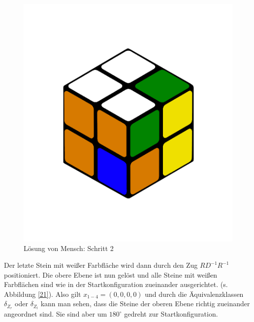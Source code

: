 \documentclass[12pt,a4paper, usenames, dvipsnames]{article}
\theoremstyle{mystyle}
\theoremstyle{definition}
\begin{document}
\begin{figure}[H]
\centering
\includegraphics[scale=0.12]{menschSchritt2.png}
\caption[Lösung von Mensch: Schritt 2]{Lösung von Mensch: Schritt 2}
\label{20}
\end{figure}

Der letzte Stein mit weißer Farbfläche wird dann durch den Zug $RD^{-1}R^{-1}$ positioniert. Die obere Ebene ist nun gelöst und alle Steine mit weißen Farbflächen sind wie in der Startkonfiguration zueinander ausgerichtet. (s. Abbildung \ref{21}).
Also gilt $x_{1-4} = (0,0,0,0)$ und durch die Äquivalenzklassen $\delta_{Z_r}$ oder $\delta_{Z_l}$ kann man sehen, dass die Steine der oberen Ebene richtig zueinander angeordnet sind. Sie sind aber um $180^\circ$ gedreht zur Startkonfiguration. 
\end{document}
